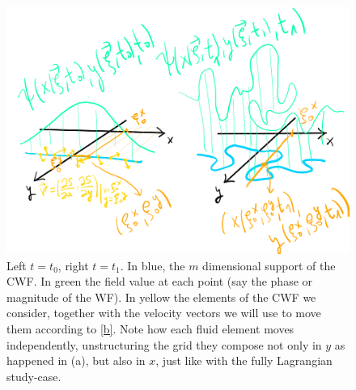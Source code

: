 \documentclass[11pt, a4paper]{article} %
\begin{document}
\begin{figure}[h!]
  \centering
    \includegraphics[width=0.65\linewidth]{unstructuring.png}
  \caption{Left $t=t_0$, right $t=t_1$. In blue, the $m$ dimensional support of the CWF. In green the field value at each point (say the phase or magnitude of the WF). In yellow the elements of the CWF we consider, together with the velocity vectors we will use to move them according to \eqref{b}. Note how each fluid element moves independently, unstructuring the grid they compose not only in $y$ as happened in (a), but also in $x$, just like with the fully Lagrangian study-case. }
  \label{fig:fallback}
\end{figure}
\end{document}
